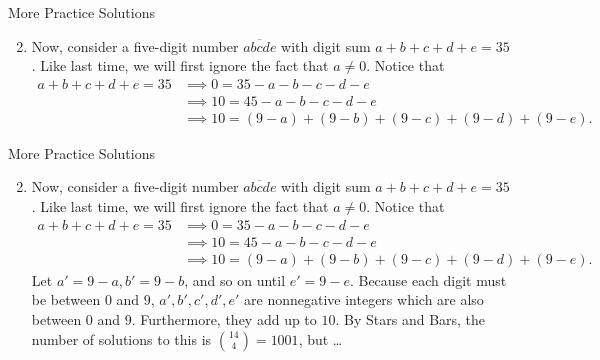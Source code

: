 \documentclass[9pt]{beamer}
\begin{document}
\begin{frame}[fragile, t]{More Practice Solutions}
    \begin{enumerate}
    \setcounter{enumi}{1}
        \item Now, consider a five-digit number $\overline{abcde}$ with digit sum $a+b+c+d+e=35$. Like last time, we will first ignore the fact that $a\neq 0$. Notice that
        \begin{align*}
            a+b+c+d+e=35 &\implies 0=35-a-b-c-d-e\\
            &\implies 10=45-a-b-c-d-e\\
            &\implies 10=(9-a)+(9-b)+(9-c)+(9-d)+(9-e).
        \end{align*}

    \end{enumerate}
    
\end{frame}

        
        


\begin{frame}[fragile, t]{More Practice Solutions}
    \begin{enumerate}
    \setcounter{enumi}{1}
        \item Now, consider a five-digit number $\overline{abcde}$ with digit sum $a+b+c+d+e=35$. Like last time, we will first ignore the fact that $a\neq 0$. Notice that
        \begin{align*}
            a+b+c+d+e=35 &\implies 0=35-a-b-c-d-e\\
            &\implies 10=45-a-b-c-d-e\\
            &\implies 10=(9-a)+(9-b)+(9-c)+(9-d)+(9-e).
        \end{align*}
        Let $a'=9-a,b'=9-b$, and so on until $e'=9-e$. Because each digit must be between $0$ and $9$, $a',b',c',d',e'$ are nonnegative integers which are also between $0$ and $9$. Furthermore, they add up to $10$. By Stars and Bars, the number of solutions to this is $\binom{14}{4}=1001$, but \ldots
        
    \end{enumerate}
    
\end{frame}

        
        
\end{document}
